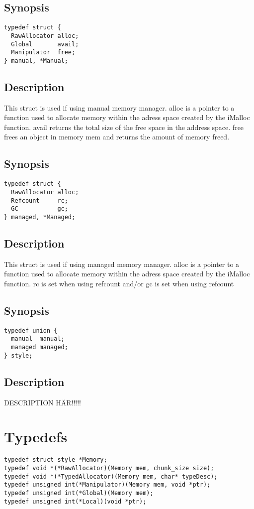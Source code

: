 \documentclass{article}
\begin{document}
\subsection*{Synopsis}
\begin{verbatim}
typedef struct {
  RawAllocator alloc;
  Global       avail;
  Manipulator  free;
} manual, *Manual; 
\end{verbatim}
\subsection*{Description}
This struct is used if using manual memory manager.
alloc is a pointer to a function used to allocate memory within the adress space created by the iMalloc function.
avail returns the total size of the free space in the address space.
free frees an object in memory mem and returns the amount of memory freed.

\subsection*{Synopsis}
\begin{verbatim}
typedef struct {
  RawAllocator alloc;
  Refcount     rc;
  GC           gc;
} managed, *Managed;
\end{verbatim}
\subsection*{Description}
This struct is used if using managed memory manager.
alloc is a pointer to a function used to allocate memory within the adress space created by the iMalloc function.
rc is set when using refcount and/or gc is set when using refcount

\subsection*{Synopsis}
\begin{verbatim}
typedef union {
  manual  manual;
  managed managed;
} style;
\end{verbatim}
\subsection*{Description}
DESCRIPTION HÄR!!!!!

\section{Typedefs} 
\begin{verbatim}
typedef struct style *Memory;
typedef void *(*RawAllocator)(Memory mem, chunk_size size);
typedef void *(*TypedAllocator)(Memory mem, char* typeDesc);
typedef unsigned int(*Manipulator)(Memory mem, void *ptr);
typedef unsigned int(*Global)(Memory mem);
typedef unsigned int(*Local)(void *ptr);
\end{verbatim}
\end{document}
